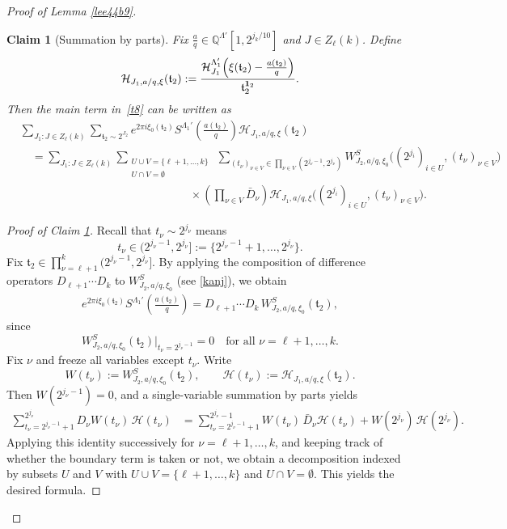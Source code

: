 \documentclass[10pt,a4paper]{amsart}
\newtheorem{claim}{Claim}\numberwithin{claim}{section}
\numberwithin{equation}{section}
\begin{document}
\begin{proof}[Proof of Lemma \ref{lee44b9}]
\begin{claim}[Summation by parts]\label{cl46}
Fix $\frac{a}{q}\in \mathbb{Q}^{\Lambda'}[1,2^{j_k/10}]$ and $J\in Z_\ell(k)$. Define
\begin{align*}
\mathcal{H}_{J_1,a/q,\xi}(\mathfrak{t}_2)
:=
\frac{\mathcal{H}^{\Lambda'_1}_{J_1}\!\left(\xi(\mathfrak{t}_2)-\frac{a(\mathfrak{t}_2)}{q}\right)}{\mathfrak{t}_2^{{\bf 1}_2}}.
\end{align*}
Then the main term in~\eqref{t8} can be written as
\begin{align}\label{t9}
&\sum_{J_1:J\in Z_\ell(k)}\sum_{\mathfrak{t}_2\sim 2^{J_2}}
e^{2\pi i \xi_0(\mathfrak{t}_2)}
S^{\Lambda_1'}\!\left(\frac{a(\mathfrak{t}_2)}{q}\right)
\mathcal{H}_{J_1,a/q,\xi}(\mathfrak{t}_2)\nonumber\\
&\quad=
\sum_{J_1:J\in Z_\ell(k)}
\sum_{\substack{U\cup V=\{\ell+1,\dots,k\}\\ U\cap V=\emptyset}}
\ \sum_{(t_\nu)_{\nu\in V}\in \prod_{\nu\in V}(2^{j_\nu-1},2^{j_\nu})}
W^S_{J_2,a/q,\xi_0}\!\big((2^{j_i})_{i\in U},(t_\nu)_{\nu\in V}\big) \\
&\quad\qquad\quad\qquad\quad\qquad\quad\qquad\quad\qquad \times
\left(\prod_{\nu\in V}\bar{D}_\nu\right)
\mathcal{H}_{J_1,a/q,\xi}\!\big((2^{j_i})_{i\in U},(t_\nu)_{\nu\in V}\big).\nonumber
\end{align}
\end{claim}


 

\begin{proof}[Proof of Claim \ref{cl46}]
Recall that $t_\nu\sim 2^{j_\nu}$ means
\[
t_\nu\in (2^{j_\nu-1},2^{j_\nu}]
:=\{2^{j_\nu-1}+1,\dots,2^{j_\nu}\}.
\]
Fix $\mathfrak{t}_2\in \prod_{\nu=\ell+1}^k (2^{j_\nu-1},2^{j_\nu}]$.
By applying the composition of difference operators $D_{\ell+1}\cdots D_k$ to $W^S_{J_2,a/q,\xi_0}$ (see \eqref{kanj}), we obtain
\begin{align*}
e^{2\pi i \xi_0(\mathfrak{t}_2)}
S^{\Lambda_1'}\!\left(\frac{a(\mathfrak{t}_2)}{q}\right)
= D_{\ell+1}\cdots D_k \, W^S_{J_2,a/q,\xi_0}(\mathfrak{t}_2),
\end{align*}
since
\[
W^S_{J_2,a/q,\xi_0}(\mathfrak{t}_2)\Big|_{t_\nu=2^{j_\nu-1}}=0
\quad \text{for all } \nu=\ell+1,\dots,k.
\]
Fix $\nu$ and freeze all variables except $t_\nu$. Write
\[
W(t_\nu):=W^S_{J_2,a/q,\xi_0}(\mathfrak{t}_2),
\qquad
\mathcal{H}(t_\nu):=\mathcal{H}_{J_1,a/q,\xi}(\mathfrak{t}_2).
\]
Then $W(2^{j_\nu-1})=0$, and a single-variable summation by parts yields
\begin{align*}
\sum_{t_\nu=2^{j_\nu-1}+1}^{2^{j_\nu}}
D_\nu W(t_\nu)\,\mathcal{H}(t_\nu)
&=
\sum_{t_\nu=2^{j_\nu-1}+1}^{2^{j_\nu}-1}
W(t_\nu)\,\bar{D}_\nu \mathcal{H}(t_\nu)
+ W(2^{j_\nu})\,\mathcal{H}(2^{j_\nu}).
\end{align*}
Applying this identity successively for $\nu=\ell+1,\dots,k$,
and keeping track of whether the boundary term is taken or not,
we obtain a decomposition indexed by subsets $U$ and $V$ with
$U\cup V=\{\ell+1,\dots,k\}$ and $U\cap V=\emptyset$.
This yields the desired formula.
\end{proof}




\end{proof}
\end{document}
